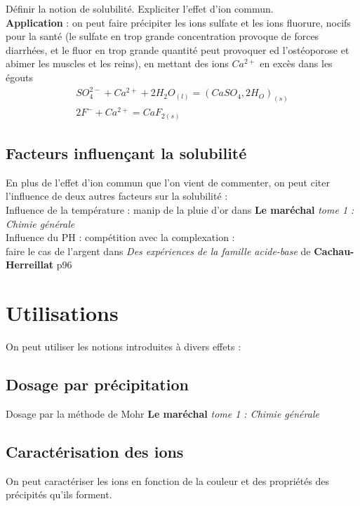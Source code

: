 \documentclass[12pt,prb,aps,epsf]{article}
\begin{document}
Définir la notion de solubilité. Expliciter l'effet d'ion commun.\\

\textbf{Application} : on peut faire précipiter les ions sulfate et les ions fluorure, nocifs pour la santé (le sulfate en trop grande concentration provoque de forces diarrhées, et le fluor en trop grande quantité peut provoquer ed l'ostéoporose et abimer les muscles et les reins), en mettant des ions $Ca^{2+}$ en excès dans les égouts 
\begin{eqnarray}
SO_4^{2-} + Ca^{2+} + 2 H_2O_{(l)}= (CaSO_{4}, 2H_O )_{(s)}\\
2F^-+Ca^{2+} = CaF_{2(s)}
\end{eqnarray}

\subsection{Facteurs influençant la solubilité}
En plus de l'effet d'ion commun que l'on vient de commenter, on peut citer l'influence de deux autres facteurs sur la solubilité :\\

Influence de la température : manip de la pluie d'or dans \textbf{Le maréchal} \textit{tome 1 : Chimie générale}\\

Influence du PH : compétition avec la complexation :\\
faire le cas de l'argent dans \textit{Des expériences de la famille acide-base} de \textbf{Cachau-Herreillat} p96

\section{Utilisations}
On peut utiliser les notions introduites à divers effets :

\subsection{Dosage par précipitation}
Dosage par la méthode de Mohr \textbf{Le maréchal} \textit{tome 1 : Chimie générale}

\subsection{Caractérisation des ions}
On peut caractériser les ions en fonction de la couleur et des propriétés des précipités qu'ils forment.\\
\end{document}
